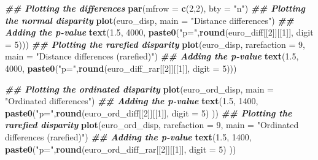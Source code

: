 \documentclass[
]{book}
\newenvironment{Shaded}{\begin{snugshade}}{\end{snugshade}}
\newcommand{\AttributeTok}[1]{\textcolor[rgb]{0.13,0.29,0.53}{#1}}
\newcommand{\DecValTok}[1]{\textcolor[rgb]{0.00,0.00,0.81}{#1}}
\newcommand{\DocumentationTok}[1]{\textcolor[rgb]{0.56,0.35,0.01}{\textbf{\textit{#1}}}}
\newcommand{\FloatTok}[1]{\textcolor[rgb]{0.00,0.00,0.81}{#1}}
\newcommand{\FunctionTok}[1]{\textcolor[rgb]{0.13,0.29,0.53}{\textbf{#1}}}
\newcommand{\NormalTok}[1]{#1}
\newcommand{\StringTok}[1]{\textcolor[rgb]{0.31,0.60,0.02}{#1}}
\begin{document}
\begin{Shaded}
\begin{Highlighting}[]
\DocumentationTok{\#\# Plotting the differences}
\FunctionTok{par}\NormalTok{(}\AttributeTok{mfrow =} \FunctionTok{c}\NormalTok{(}\DecValTok{2}\NormalTok{,}\DecValTok{2}\NormalTok{), }\AttributeTok{bty =} \StringTok{"n"}\NormalTok{)}
\DocumentationTok{\#\# Plotting the normal disparity}
\FunctionTok{plot}\NormalTok{(euro\_disp, }\AttributeTok{main =} \StringTok{"Distance differences"}\NormalTok{)}
\DocumentationTok{\#\# Adding the p{-}value}
\FunctionTok{text}\NormalTok{(}\FloatTok{1.5}\NormalTok{, }\DecValTok{4000}\NormalTok{, }\FunctionTok{paste0}\NormalTok{(}\StringTok{"p="}\NormalTok{,}\FunctionTok{round}\NormalTok{(euro\_diff[[}\DecValTok{2}\NormalTok{]][[}\DecValTok{1}\NormalTok{]], }\AttributeTok{digit =} \DecValTok{5}\NormalTok{)))}
\DocumentationTok{\#\# Plotting the rarefied disparity}
\FunctionTok{plot}\NormalTok{(euro\_disp, }\AttributeTok{rarefaction =} \DecValTok{9}\NormalTok{, }\AttributeTok{main =} \StringTok{"Distance differences (rarefied)"}\NormalTok{)}
\DocumentationTok{\#\# Adding the p{-}value}
\FunctionTok{text}\NormalTok{(}\FloatTok{1.5}\NormalTok{, }\DecValTok{4000}\NormalTok{, }\FunctionTok{paste0}\NormalTok{(}\StringTok{"p="}\NormalTok{,}\FunctionTok{round}\NormalTok{(euro\_diff\_rar[[}\DecValTok{2}\NormalTok{]][[}\DecValTok{1}\NormalTok{]], }\AttributeTok{digit =} \DecValTok{5}\NormalTok{)))}

\DocumentationTok{\#\# Plotting the ordinated disparity}
\FunctionTok{plot}\NormalTok{(euro\_ord\_disp, }\AttributeTok{main =} \StringTok{"Ordinated differences"}\NormalTok{)}
\DocumentationTok{\#\# Adding the p{-}value}
\FunctionTok{text}\NormalTok{(}\FloatTok{1.5}\NormalTok{, }\DecValTok{1400}\NormalTok{, }\FunctionTok{paste0}\NormalTok{(}\StringTok{"p="}\NormalTok{,}\FunctionTok{round}\NormalTok{(euro\_ord\_diff[[}\DecValTok{2}\NormalTok{]][[}\DecValTok{1}\NormalTok{]], }\AttributeTok{digit =} \DecValTok{5}\NormalTok{) ))}
\DocumentationTok{\#\# Plotting the rarefied disparity}
\FunctionTok{plot}\NormalTok{(euro\_ord\_disp, }\AttributeTok{rarefaction =} \DecValTok{9}\NormalTok{, }\AttributeTok{main =} \StringTok{"Ordinated differences (rarefied)"}\NormalTok{)}
\DocumentationTok{\#\# Adding the p{-}value}
\FunctionTok{text}\NormalTok{(}\FloatTok{1.5}\NormalTok{, }\DecValTok{1400}\NormalTok{, }\FunctionTok{paste0}\NormalTok{(}\StringTok{"p="}\NormalTok{,}\FunctionTok{round}\NormalTok{(euro\_ord\_diff\_rar[[}\DecValTok{2}\NormalTok{]][[}\DecValTok{1}\NormalTok{]], }\AttributeTok{digit =} \DecValTok{5}\NormalTok{) ))}
\end{Highlighting}
\end{Shaded}
\end{document}
